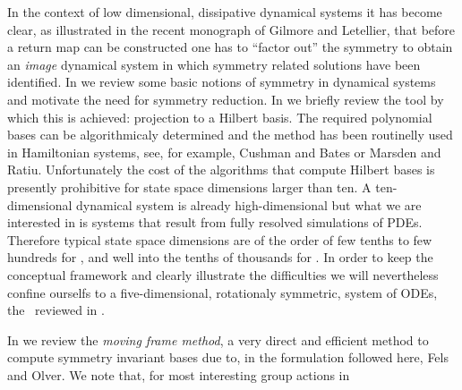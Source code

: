 In the context of low dimensional, dissipative dynamical systems it has become clear, as illustrated
in the recent monograph of Gilmore and Letellier, that before a return
map can be constructed one has to ``factor out'' the symmetry to obtain an \emph{image}
dynamical system in which symmetry related solutions have been identified. In  we
review some basic notions of symmetry in dynamical systems and motivate the need for symmetry 
reduction. In  we briefly review the tool by which this is achieved: projection 
to a Hilbert basis. The required polynomial bases can be algorithmicaly determined
and the method has been routinelly used in Hamiltonian systems, see, for example, 
Cushman and Bates or Marsden and Ratiu. 
Unfortunately the cost of the algorithms that compute Hilbert bases is presently prohibitive 
for state space dimensions larger than ten. A ten-dimensional dynamical system is already high-dimensional
but what we are interested in is systems that result from fully resolved simulations of PDEs.
Therefore typical state space dimensions are of the order of few tenths to few hundreds for \KSe, and
well into the tenths of thousands for \PCf. In order to keep the conceptual framework and clearly illustrate
the difficulties we will nevertheless confine ourselfs to a five-dimensional, rotationaly symmetric, 
system of ODEs, the \CLe\ reviewed in .

In  we review the \emph{moving frame method}, a very direct and efficient method to compute 
symmetry invariant bases due to, in the formulation followed here, Fels and Olver.
We note that, for most interesting group actions in  



